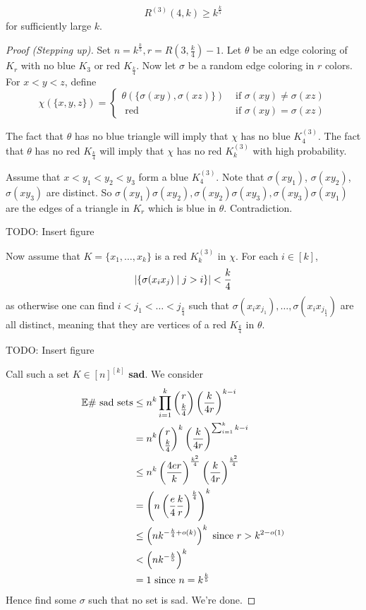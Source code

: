 \documentclass{article}
\begin{document}
\begin{thm}
  $$R^{(3)}(4, k) \ge k^{\frac k5}$$
  for sufficiently large $k$.
\end{thm}
\begin{proof}[Proof (Stepping up)]
  Set $n = k^{\frac k5}, r = R(3, \frac k4) - 1$. Let $\theta$ be an edge coloring of $K_r$ with no blue $K_3$ or red $K_{\frac k4}$. Now let $\sigma$ be a random edge coloring in $r$ colors. For $x < y < z$, define
  $$\chi(\{x, y, z\}) =
  \begin{cases}
    \theta(\{\sigma(xy), \sigma(xz)\}) & \text{ if } \sigma(xy) \ne \sigma(xz) \\
    \text{ red} & \text{ if } \sigma(xy) = \sigma(xz)
  \end{cases}$$
  \begin{idea}
    The fact that $\theta$ has no blue triangle will imply that $\chi$ has no blue $K_4^{(3)}$. The fact that $\theta$ has no red $K_{\frac k4}$ will imply that $\chi$ has no red $K_k^{(3)}$ with high probability.
  \end{idea}
  Assume that $x < y_1 < y_2 < y_3$ form a blue $K_4^{(3)}$. Note that $\sigma(xy_1)$, $\sigma(xy_2)$, $\sigma(xy_3)$ are distinct. So $\sigma(xy_1)\sigma(xy_2), \sigma(xy_2)\sigma(xy_3), \sigma(xy_3)\sigma(xy_1)$ are the edges of a triangle in $K_r$ which is blue in $\theta$. Contradiction.
  
  TODO: Insert figure

  Now assume that $K = \{x_1, \dots, x_k\}$ is a red $K_k^{(3)}$ in $\chi$. For each $i \in [k]$,
  $$\left\lvert \{\sigma(x_ix_j) \mid j > i\}\right\rvert < \frac k4$$
  as otherwise one can find $i < j_1 < \dots < j_{\frac k4}$ such that $\sigma(x_ix_{j_1}), \dots, \sigma(x_ix_{j_{\frac k4}})$ are all distinct, meaning that they are vertices of a red $K_{\frac k4}$ in $\theta$.
  
  TODO: Insert figure

  Call such a set $K \in [n]^{[k]}$ {\bf sad}. We consider
  \begin{align*}
    \mathbb E \#\text{ sad sets}
    & \le n^k \prod_{i = 1}^k \binom r{\frac k4} \left(\frac k{4r}\right)^{k - i} \\
    & = n^k \binom r{\frac k4}^k \left(\frac k{4r}\right)^{\sum_{i = 1}^k k - i} \\
    & \le n^k \left(\frac{4er}k\right)^{\frac{k^2}4} \left(\frac k{4r}\right)^{\frac{k^2}4} \\
    & = \left(n\left(\frac e4 \frac kr\right)^{\frac k4}\right)^k \\
    & \le \left(nk^{-\frac k4 + o(k)}\right)^k \text{ since } r > k^{2 - o(1)} \\
    & < \left(nk^{-\frac k5}\right)^k \\
    & = 1 \text{ since } n = k^{\frac k5}
  \end{align*}
  Hence find some $\sigma$ such that no set is sad. We're done.
\end{proof}

\newlec

\printindex
\end{document}
